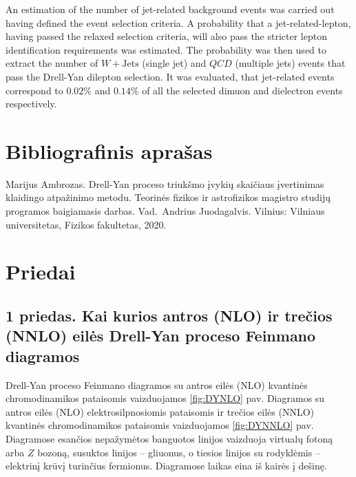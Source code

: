 \documentclass[a4paper, 12pt, oneside]{article}
\newcommand{\WJets}{W\! +\!\mathrm{Jets}}
\newcommand{\QCD}{QC\! D}
\newlength\q
\begin{document}
An estimation of the number of jet-related background events was carried out having defined the event selection criteria.
A probability that a jet-related-lepton, having passed the relaxed selection criteria, will also pass the stricter lepton
identification requirements was estimated.
The probability was then used to extract the number of $\WJets$ (single jet) and $\QCD$ (multiple jets)
events that pass the Drell-Yan dilepton selection.
It was evaluated, that jet-related events correspond to $0.02\%$ and $0.14\%$ of all the selected dimuon and dielectron
events respectively.


\newpage
\section*{Bibliografinis aprašas}
Marijus Ambrozas. Drell-Yan proceso triukšmo įvykių skaičiaus įvertinimas klaidingo atpažinimo metodu.
Teorinės fizikos ir astrofizikos magistro studijų programos baigiamasis darbas.
Vad.\ Andrius Juodagalvis. Vilnius: Vilniaus universitetas, Fizikos fakultetas, 2020.


\newpage
\section*{Priedai} 

\subsection*{1 priedas. Kai kurios antros (NLO) ir trečios (NNLO) eilės Drell-Yan proceso Feinmano diagramos}
Drell-Yan proceso Feinmano diagramos su antros eilės (NLO) kvantinės chromodinamikos pataisomis vaizduojamos \ref{fig:DYNLO} pav.
Diagramos su antros eilės (NLO) elektrosilpnosiomis pataisomis ir trečios eilės (NNLO) kvantinės chromodinamikos pataisomis
vaizduojamos \ref{fig:DYNNLO} pav.
Diagramose esančios nepažymėtos banguotos linijos vaizduoja virtualų fotoną arba $Z$ bozoną, susuktos linijos -- gliuonus, o
tiesios linijos su rodyklėmis -- elektrinį krūvį turinčius fermionus.
Diagramose laikas eina iš kairės į dešinę.
\end{document}
